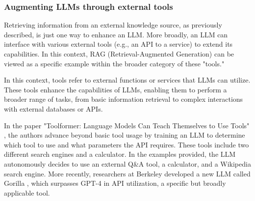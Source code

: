 \subsubsection*{Augmenting LLMs through external tools}

Retrieving information from an external knowledge source, as previously described, is just one way to enhance an LLM. More broadly, an LLM can interface with various external tools (e.g., an API to a service) to extend its capabilities. In this context, RAG (Retrieval-Augmented Generation) can be viewed as a specific example within the broader category of these "tools."

In this context, tools refer to external functions or services that LLMs can utilize. These tools enhance the capabilities of LLMs, enabling them to perform a broader range of tasks, from basic information retrieval to complex interactions with external databases or APIs.

In the paper "Toolformer: Language Models Can Teach Themselves to Use Tools" \cite{schick2023toolformer}, the authors advance beyond basic tool usage by training an LLM to determine which tool to use and what parameters the API requires. These tools include two different search engines and a calculator. In the examples provided, the LLM autonomously decides to use an external Q\&A tool, a calculator, and a Wikipedia search engine. More recently, researchers at Berkeley developed a new LLM called Gorilla \cite{patil2023gorilla}, which surpasses GPT-4 in API utilization, a specific but broadly applicable tool.